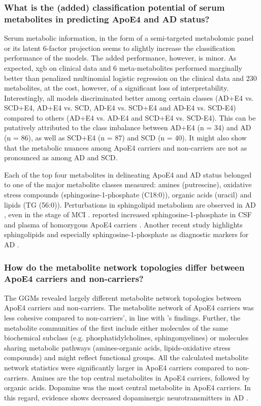 \documentclass{amsart}
\begin{document}
\subsubsection{What is the (added) classification potential of serum metabolites in predicting ApoE4 and AD
status?}
Serum metabolic information, in the form of a semi-targeted metabolomic panel or its latent 6-factor projection seems to slightly increase the classification performance of the models. The added performance, however, is minor. As expected, \acrshort{xgb} on clinical data and 6 meta-metabolites performed marginally better than penalized multinomial logistic regression on the clinical data and 230 metabolites, at the cost, however, of a significant loss of interpretability. Interestingly, all models discriminated better among certain classes (AD+E4 vs. SCD+E4, AD+E4 vs. SCD, AD-E4 vs. SCD+E4 and AD-E4 vs. SCD-E4) compared to others (AD+E4 vs. AD-E4 and SCD+E4 vs. SCD-E4). This can be putatively attributed to the class imbalance between AD+E4 (n = 34) and AD (n = 86), as well as SCD+E4 (n = 87) and SCD (n = 40). It might also show that the metabolic nuances among ApoE4 carriers and non-carriers are not as pronounced as among AD and SCD.

Each of the top four metabolites in delineating ApoE4 and AD status belonged to one of the major metabolite classes measured: amines (putrescine), oxidative stress compounds (sphingosine-1-phosphate (C18:0)), organic acids (uracil) and lipids (TG (56:0)). Perturbations in sphingolipid metabolism are observed in AD \cite{mielke2010alterations}, even in the stage of MCI \cite{den2023sphingolipids}.  reported increased sphingosine-1-phosphate in CSF and plasma of homozygous ApoE4 carriers \cite{den2023sphingolipids}. Another recent study highlights sphingolipids and especially sphingosine-1-phosphate as diagnostic markers for AD \cite{d2022sphingolipid}.

\subsubsection{How do the metabolite network topologies differ between ApoE4 carriers and non-carriers?}
The GGMs revealed largely different metabolite network topologies between ApoE4 carriers and non-carriers. The metabolite network of ApoE4 carriers was less cohesive compared to non-carriers', in line with \citeauthor{deLeeuw2017Blood-basedDisease}'s findings. Further, the metabolite communities of the first include either molecules of the same biochemical subclass (e.g. phosphatidylcholines, sphingomyelines) or molecules sharing metabolic pathways (amines-organic acids, lipids-oxidative stress compounds) and might reflect functional groups. All the calculated metabolite network statistics were significantly larger in ApoE4 carriers compared to non-carriers. Amines are the top central metabolites in ApoE4 carriers, followed by organic acids. Dopamine was the most central metabolite in ApoE4 carriers. In this regard, evidence shows decreased dopaminergic neurotransmitters in AD \cite{shaikh2023targeting,pan2019dopamine}.
\end{document}
